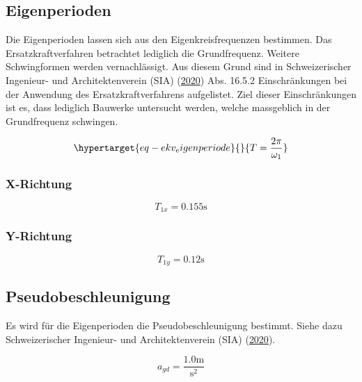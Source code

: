 \documentclass[
  letterpaper,
  DIV=11]{scrreprt}
\begin{document}
\hypertarget{eigenperioden}{%
\subsection{Eigenperioden}\label{eigenperioden}}

Die Eigenperioden lassen sich aus den Eigenkreisfrequenzen bestimmen.
Das Ersatzkraftverfahren betrachtet lediglich die Grundfrequenz. Weitere
Schwingformen werden vernachlässigt. Aus diesem Grund sind in
Schweizerischer Ingenieur- und Architektenverein (SIA)
(\protect\hyperlink{ref-SIA261_2020}{2020}) Abs. 16.5.2 Einschränkungen
bei der Anwendung des Ersatzkraftverfahrens aufgelistet. Ziel dieser
Einschränkungen ist es, dass lediglich Bauwerke untersucht werden,
welche massgeblich in der Grundfrequenz schwingen.

\begin{equation}\protect\hypertarget{eq-ekv_eigenperiode}{}{
T = \frac{2\pi}{\omega_1}
}\label{eq-ekv_eigenperiode}\end{equation}

\hypertarget{x-richtung-3}{%
\subsubsection{X-Richtung}\label{x-richtung-3}}

\begin{equation}T_{1 x} = 0.155 \text{s}\end{equation}

\hypertarget{y-richtung-3}{%
\subsubsection{Y-Richtung}\label{y-richtung-3}}

\begin{equation}T_{1 y} = 0.12 \text{s}\end{equation}

\hypertarget{pseudobeschleunigung}{%
\subsection{Pseudobeschleunigung}\label{pseudobeschleunigung}}

Es wird für die Eigenperioden die Pseudobeschleunigung bestimmt. Siehe
dazu Schweizerischer Ingenieur- und Architektenverein (SIA)
(\protect\hyperlink{ref-SIA261_2020}{2020}).

\begin{equation}a_{gd} = \frac{1.0 \text{m}}{\text{s}^{2}}\end{equation}
\end{document}
